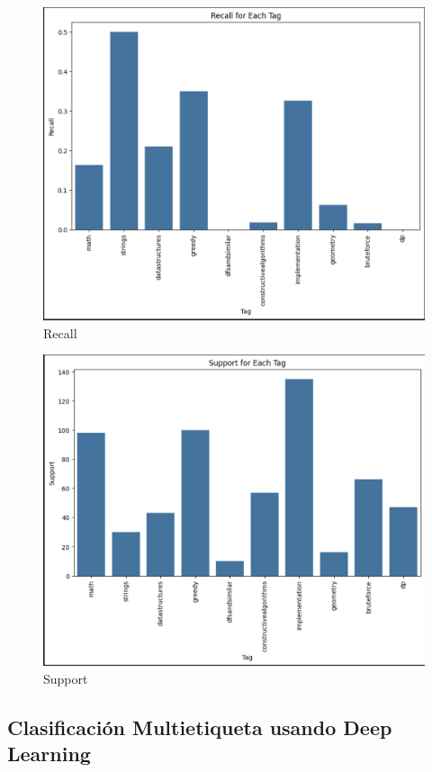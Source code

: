 \documentclass{article}
\begin{document}
\begin{figure}[H]
    \centering
    \includegraphics[scale=0.49]{imgs/recallknn.png}
    \caption{Recall}
    \label{fig:r}
\end{figure}
\begin{figure}[H]
    \centering
    \includegraphics[scale=0.49]{imgs/supportkn.png}
    \caption{Support}
    \label{fig:s}
\end{figure}

\subsection{Clasificación Multietiqueta usando Deep Learning}
\end{document}
